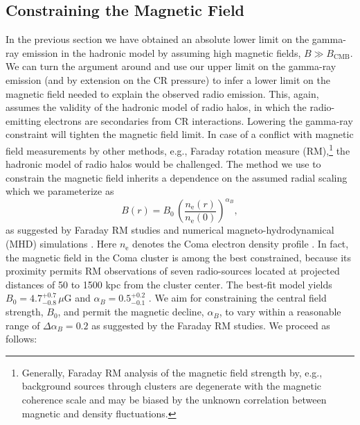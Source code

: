 \documentclass[12pt,manuscript]{aastex}
\newcommand{\rmn}{\mathrm}
\begin{document}
\subsection{Constraining the Magnetic Field}
\label{sec:B}
In the previous section we have obtained an absolute lower limit on the gamma-ray emission in
the hadronic model by assuming high magnetic fields, $B\gg B_\rmn{CMB}$. We can turn the
argument around and use our upper limit on the gamma-ray emission (and by extension on the
CR pressure) to infer a lower limit on the magnetic field needed to explain the observed radio
emission. This, again, assumes the validity of the hadronic model of radio halos, in which the
radio-emitting electrons are secondaries from CR interactions. Lowering the gamma-ray
constraint will tighten the magnetic field limit. In case of a conflict with magnetic field
measurements by other methods, e.g., Faraday rotation measure (RM),\footnote{Generally,
Faraday RM analysis of the magnetic field strength by, e.g., background sources through
clusters are degenerate with the magnetic coherence scale and may be biased by the unknown
correlation between magnetic and density fluctuations.} the hadronic model of radio halos would
be challenged. The method we use to constrain the magnetic field inherits a dependence on
the assumed radial scaling which we parameterize as
\begin{equation}
\label{eq:B}
B(r) = B_{0} \,\left(\frac{n_{\rmn{e}}(r)}{n_{\rmn{e}}(0)}\right)^{\alpha_B},
\end{equation}
as suggested by Faraday RM studies and numerical magneto-hydrodynamical (MHD) simulations
\citep[][and references therein]{article:Bonafede_etal:2010, article:Bonafede_etal:2011}. Here
$n_{\rmn{e}}$ denotes the Coma electron density profile \citep{article:BrielHenryBohringer:1992}.
In fact, the magnetic field in the Coma cluster is among the best constrained, because its proximity
permits RM observations of seven radio-sources located at projected distances of 50 to 1500 kpc from
the cluster center. The best-fit model yields $B_{0} = 4.7^{+0.7}_{-0.8}\,\mu$G and $\alpha_{B} =
0.5^{+0.2}_{-0.1}$ \citep{article:Bonafede_etal:2010}. We aim for constraining the central field
strength, $B_{0}$, and permit the magnetic decline, $\alpha_{B}$, to vary within a reasonable range
of $\Delta\alpha_{B}=0.2$ as suggested by the Faraday RM studies.  We proceed as follows:
\end{document}

